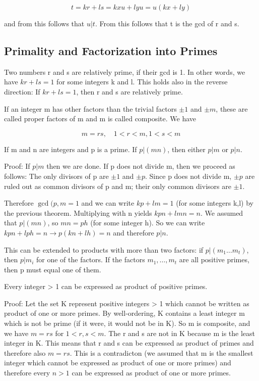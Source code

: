 \[
t = kr + ls = kxu + lyu = u(kx + ly)
\]

and from this follows that \(u|t\). From this follows that t is the gcd
of r and s.

\subsection{Primality and Factorization into
Primes}\label{primality-and-factorization-into-primes}

Two numbers r and s are relatively prime, if their gcd is 1. In other
words, we have \(kr + ls = 1\) for some integers k and l. This holds
also in the reverse direction: If \(kr + ls = 1\), then r and s are
relatively prime.

If an integer m has other factors than the trivial factors \(\pm 1\) and
\(\pm m\), these are called proper factors of m and m is called
composite. We have

\[
m = rs, \quad 1 < r < m, 1 < s < m
\]

If m and n are integers and p is a prime. If \(p|(mn)\), then either
\(p|m\) or \(p|n\).

Proof: If \(p|m\) then we are done. If p does not divide m, then we
proceed as follows: The only divisors of p are \(\pm 1\) and \(\pm p\).
Since p does not divide m, \(\pm p\) are ruled out as common divisors of
p and m; their only common divisors are \(\pm 1\).

Therefore \(\gcd(p,m=1\) and we can write \(kp + lm = 1\) (for some
integers k,l) by the previous theorem. Multiplying with n yields
\(kpn + lmn = n\). We assumed that \(p|(mn)\), so \(mn = ph\) (for some
integer h). So we can write \(kpn + lph = n \rightarrow p(kn + lh) = n\)
and therefore \(p|n\).

This can be extended to products with more than two factors: if
\(p|(m_1 \ldots m_t)\), then \(p|m_i\) for one of the factors. If the
factors \(m_1,\ldots,m_t\) are all positive primes, then p must equal
one of them.

Every integer \textgreater{} 1 can be expressed as product of positive
primes.

Proof: Let the set K represent positive integers \textgreater{} 1 which
cannot be written as product of one or more primes. By well-ordering, K
contains a least integer m which is not be prime (if it were, it would
not be in K). So m is composite, and we have \(m = rs\) for
\(1 < r,s < m\). The r and s are not in K because m is the least integer
in K. This means that r and s can be expressed as product of primes and
therefore also \(m=rs\). This is a contradicton (we assumed that m is
the smallest integer which cannot be expressed as product of one or more
primes) and therefore every \(n>1\) can be expressed as product of one
or more primes.

